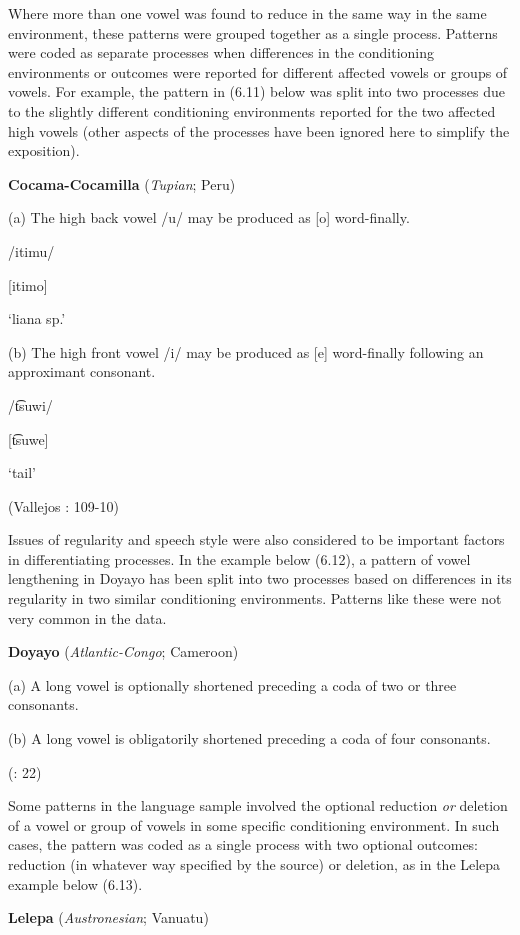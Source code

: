   Where more than one vowel was found to reduce in the same way in the same environment, these patterns were grouped together as a single process. Patterns were coded as separate processes when differences in the conditioning environments or outcomes were reported for different affected vowels or groups of vowels. For example, the pattern in (6.11) below was split into two processes due to the slightly different conditioning environments reported for the two affected high vowels (other aspects of the processes have been ignored here to simplify the exposition).

\ea\label{ex:(6.11)}
   \textbf{Cocama-Cocamilla} (\textit{Tupian}; Peru)

(a)  The high back vowel /u/ may be produced as [o] word-finally.

/itimu/

[itimo]

‘liana sp.’

(b)   The high front vowel /i/ may be produced as [e] word-finally following an approximant consonant.

/t͡suwi/

[t͡suwe]

‘tail’

(Vallejos \citealt{Yopán2010}: 109-10)
\z

  Issues of regularity and speech style were also considered to be important factors in differentiating processes. In the example below (6.12), a pattern of vowel lengthening in Doyayo has been split into two processes based on differences in its regularity in two similar conditioning environments. Patterns like these were not very common in the data.

\ea\label{ex:(6.12)}
   \textbf{Doyayo} (\textit{Atlantic-Congo}; Cameroon)

(a)  A long vowel is optionally shortened preceding a coda of two or three consonants.

(b)   A long vowel is obligatorily shortened preceding a coda of four consonants.

(\citealt{WieringWiering1994}: 22)
\z

  Some patterns in the language sample involved the optional reduction \textit{or} deletion of a vowel or group of vowels in some specific conditioning environment. In such cases, the pattern was coded as a single process with two optional outcomes: reduction (in whatever way specified by the source) or deletion, as in the Lelepa example below (6.13).

\ea\label{ex:(6.13)}
   \textbf{Lelepa} (\textit{Austronesian}; Vanuatu)


